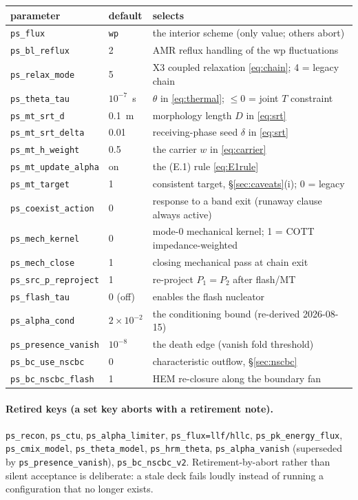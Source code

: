 \documentclass[11pt,a4paper]{article}
\newcommand{\code}[1]{\texttt{\small #1}}
\begin{document}
\begin{center}
\begin{tabular}{@{}lll@{}}
\toprule
parameter & default & selects \\
\midrule
\code{ps\_flux}              & \code{wp} & the interior scheme (only value; others abort) \\
\code{ps\_bl\_reflux}        & 2 & AMR reflux handling of the wp fluctuations \\
\code{ps\_relax\_mode}       & 5 & X3 coupled relaxation \eqref{eq:chain}; 4 = legacy chain \\
\code{ps\_theta\_tau}        & $10^{-7}$~s & $\theta$ in \eqref{eq:thermal}; $\le0$ = joint $T$ constraint \\
\code{ps\_mt\_srt\_d}        & 0.1~m & morphology length $D$ in \eqref{eq:srt} \\
\code{ps\_mt\_srt\_delta}    & 0.01 & receiving-phase seed $\delta$ in \eqref{eq:srt} \\
\code{ps\_mt\_h\_weight}     & 0.5 & the carrier $w$ in \eqref{eq:carrier} \\
\code{ps\_mt\_update\_alpha} & on  & the (E.1) rule \eqref{eq:E1rule} \\
\code{ps\_mt\_target}        & 1 & consistent target, \S\ref{sec:caveats}(i); 0 = legacy \\
\code{ps\_coexist\_action}   & 0 & response to a band exit (runaway clause always active) \\
\code{ps\_mech\_kernel}      & 0 & mode-0 mechanical kernel; 1 = COTT impedance-weighted \\
\code{ps\_mech\_close}       & 1 & closing mechanical pass at chain exit \\
\code{ps\_src\_p\_reproject} & 1 & re-project $P_1\!=\!P_2$ after flash/MT \\
\code{ps\_flash\_tau}        & 0 (off) & enables the flash nucleator \\
\code{ps\_alpha\_cond}       & $2\times10^{-2}$ & the conditioning bound (re-derived 2026-08-15) \\
\code{ps\_presence\_vanish}  & $10^{-8}$ & the death edge (vanish fold threshold) \\
\code{ps\_bc\_use\_nscbc}    & 0 & characteristic outflow, \S\ref{sec:nscbc} \\
\code{ps\_bc\_nscbc\_flash}  & 1 & HEM re-closure along the boundary fan \\
\bottomrule
\end{tabular}
\end{center}

\paragraph{Retired keys (a set key aborts with a retirement note).}
\code{ps\_recon}, \code{ps\_ctu}, \code{ps\_alpha\_limiter},
\code{ps\_flux=llf/hllc}, \code{ps\_pk\_energy\_flux},
\code{ps\_cmix\_model}, \code{ps\_theta\_model}, \code{ps\_hrm\_theta},
\code{ps\_alpha\_vanish} (superseded by \code{ps\_presence\_vanish}),
\code{ps\_bc\_nscbc\_v2}.  Retirement-by-abort rather than silent
acceptance is deliberate: a stale deck fails loudly instead of running a
configuration that no longer exists.
\end{document}

